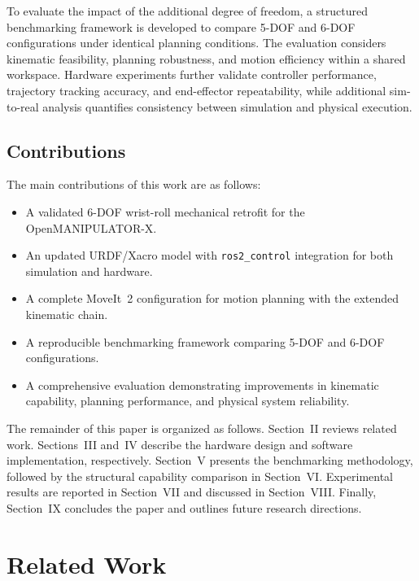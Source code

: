 \documentclass[conference]{IEEEtran}
\begin{document}
	To evaluate the impact of the additional degree of freedom, a
	structured benchmarking framework is developed to compare 5-DOF and
	6-DOF configurations under identical planning conditions. The
	evaluation considers kinematic feasibility, planning robustness, and
	motion efficiency within a shared workspace. Hardware experiments
	further validate controller performance, trajectory tracking accuracy,
	and end-effector repeatability, while additional sim-to-real analysis
	quantifies consistency between simulation and physical execution.
	
	\subsection*{Contributions}
	The main contributions of this work are as follows:
	
	\begin{itemize}
		\item A validated 6-DOF wrist-roll mechanical retrofit for the
		OpenMANIPULATOR-X.
		\item An updated URDF/Xacro model with \texttt{ros2\_control}
		integration for both simulation and hardware.
		\item A complete MoveIt~2 configuration for motion planning
		with the extended kinematic chain.
		\item A reproducible benchmarking framework comparing 5-DOF
		and 6-DOF configurations.
		\item A comprehensive evaluation demonstrating improvements in
		kinematic capability, planning performance, and physical system
		reliability.
	\end{itemize}
	
	The remainder of this paper is organized as follows. Section~II reviews
	related work. Sections~III and~IV describe the hardware design and
	software implementation, respectively. Section~V presents the
	benchmarking methodology, followed by the structural capability
	comparison in Section~VI. Experimental results are reported in
	Section~VII and discussed in Section~VIII. Finally, Section~IX
	concludes the paper and outlines future research directions.
	
	
	\section{Related Work}
	\label{sec:related_work}
	
\end{document}
